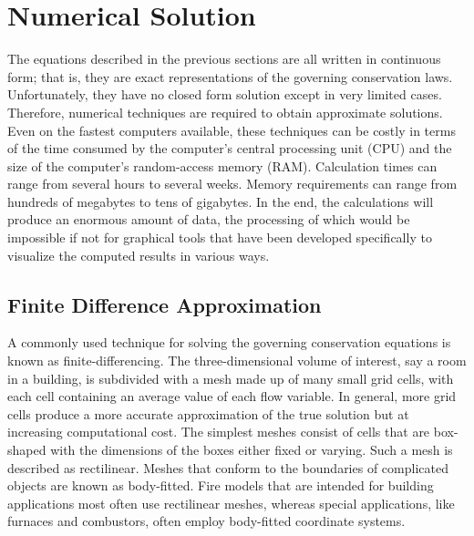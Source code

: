 \documentclass[graybox]{svmult}
\begin{document}
\section{Numerical Solution}

The  equations  described  in  the  previous  sections are all written in continuous form; that is, they are exact representations of the governing conservation laws. Unfortunately, they have no closed form solution except in very limited cases. Therefore, numerical techniques are required to obtain approximate solutions. Even on the fastest computers available, these techniques can be costly in terms of the time consumed by the computer's central processing unit (CPU) and the size of the computer's random-access memory (RAM). Calculation times can range from several hours to several weeks. Memory requirements can range from hundreds of megabytes to tens of gigabytes. In the end, the calculations will produce an enormous amount of data, the processing of which would be impossible if not for graphical tools that have been developed specifically to visualize the computed results in various ways.

\subsection{Finite Difference Approximation}

\label{fin_diff}

A commonly used technique for solving the governing conservation equations is known as finite-differencing. The three-dimensional volume of interest, say a room in a building, is subdivided with a mesh made up of many small grid cells, with each cell containing an average value of each flow variable. In general, more grid cells produce a more accurate approximation of the true solution but at increasing computational cost. The simplest meshes consist of cells that are box-shaped with the dimensions of the boxes either fixed or varying. Such a mesh is described as rectilinear. Meshes that conform to the boundaries of complicated objects are known as body-fitted. Fire models that are intended for building applications most often use rectilinear meshes, whereas special applications, like furnaces and combustors, often employ body-fitted coordinate systems.
\end{document}
